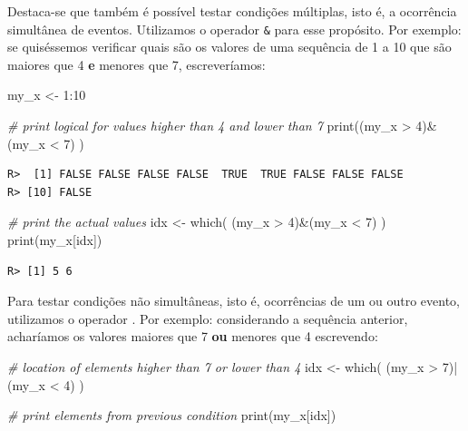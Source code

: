 \documentclass[
  11pt,
]{book}
\newenvironment{Shaded}{\begin{snugshade}}{\end{snugshade}}
\newcommand{\CommentTok}[1]{\textcolor[rgb]{0.37,0.37,0.37}{\textit{#1}}}
\newcommand{\DecValTok}[1]{\textcolor[rgb]{0.06,0.06,0.06}{#1}}
\newcommand{\FunctionTok}[1]{\textcolor[rgb]{0,0,0}{#1}}
\newcommand{\NormalTok}[1]{#1}
\newcommand{\OtherTok}[1]{\textcolor[rgb]{0.37,0.37,0.37}{#1}}
\newcommand{\SpecialCharTok}[1]{\textcolor[rgb]{0,0,0}{#1}}
\begin{document}
Destaca-se que também é possível testar condições múltiplas, isto é, a ocorrência simultânea de eventos. Utilizamos o operador \texttt{\&} para esse propósito. Por exemplo: se quiséssemos verificar quais são os valores de uma sequência de 1 a 10 que são maiores que 4 \textbf{e} menores que 7, escreveríamos:

\begin{Shaded}
\begin{Highlighting}[]
\NormalTok{my\_x }\OtherTok{\textless{}{-}} \DecValTok{1}\SpecialCharTok{:}\DecValTok{10}

\CommentTok{\# print logical for values higher than 4 and lower than 7}
\FunctionTok{print}\NormalTok{((my\_x }\SpecialCharTok{\textgreater{}} \DecValTok{4}\NormalTok{)}\SpecialCharTok{\&}\NormalTok{(my\_x }\SpecialCharTok{\textless{}} \DecValTok{7}\NormalTok{) )}
\end{Highlighting}
\end{Shaded}

\begin{verbatim}
R>  [1] FALSE FALSE FALSE FALSE  TRUE  TRUE FALSE FALSE FALSE
R> [10] FALSE
\end{verbatim}

\begin{Shaded}
\begin{Highlighting}[]
\CommentTok{\# print the actual values}
\NormalTok{idx }\OtherTok{\textless{}{-}} \FunctionTok{which}\NormalTok{( (my\_x }\SpecialCharTok{\textgreater{}} \DecValTok{4}\NormalTok{)}\SpecialCharTok{\&}\NormalTok{(my\_x }\SpecialCharTok{\textless{}} \DecValTok{7}\NormalTok{) )}
\FunctionTok{print}\NormalTok{(my\_x[idx])}
\end{Highlighting}
\end{Shaded}

\begin{verbatim}
R> [1] 5 6
\end{verbatim}

Para testar condições não simultâneas, isto é, ocorrências de um ou outro evento, utilizamos o operador \texttt{\textbar{}}. Por exemplo: considerando a sequência anterior, acharíamos os valores maiores que 7 \textbf{ou} menores que 4 escrevendo:

\begin{Shaded}
\begin{Highlighting}[]
\CommentTok{\# location of elements higher than 7 or lower than 4}
\NormalTok{idx }\OtherTok{\textless{}{-}} \FunctionTok{which}\NormalTok{( (my\_x }\SpecialCharTok{\textgreater{}} \DecValTok{7}\NormalTok{)}\SpecialCharTok{|}\NormalTok{(my\_x }\SpecialCharTok{\textless{}} \DecValTok{4}\NormalTok{) )}

\CommentTok{\# print elements from previous condition}
\FunctionTok{print}\NormalTok{(my\_x[idx])}
\end{Highlighting}
\end{Shaded}
\end{document}
